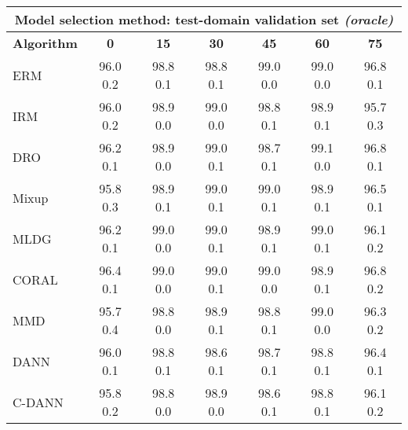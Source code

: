 \documentclass{article}
\begin{document}
\begin{center}
\begin{tabular}{lcccccc}
\toprule
\multicolumn{7}{c}{\textbf{Model selection method: test-domain validation set \textit{(oracle)}}} \\
\midrule
\textbf{Algorithm}    & \textbf{0}      & \textbf{15}     & \textbf{30}     & \textbf{45}     & \textbf{60}     & \textbf{75}     \\
\midrule
ERM                       & 96.0  0.2            & 98.8  0.1            & 98.8  0.1            & 99.0  0.0            & 99.0  0.0            & 96.8  0.1            \\
IRM                       & 96.0  0.2            & 98.9  0.0            & 99.0  0.0            & 98.8  0.1            & 98.9  0.1            & 95.7  0.3            \\
DRO                 & 96.2  0.1            & 98.9  0.0            & 99.0  0.1            & 98.7  0.1            & 99.1  0.0            & 96.8  0.1            \\
Mixup                     & 95.8  0.3            & 98.9  0.1            & 99.0  0.1            & 99.0  0.1            & 98.9  0.1            & 96.5  0.1            \\
MLDG                      & 96.2  0.1            & 99.0  0.0            & 99.0  0.1            & 98.9  0.1            & 99.0  0.1            & 96.1  0.2            \\
CORAL                     & 96.4  0.1            & 99.0  0.0            & 99.0  0.1            & 99.0  0.0            & 98.9  0.1            & 96.8  0.2            \\
MMD                       & 95.7  0.4            & 98.8  0.0            & 98.9  0.1            & 98.8  0.1            & 99.0  0.0            & 96.3  0.2            \\
DANN                       & 96.0  0.1            & 98.8  0.1            & 98.6  0.1            & 98.7  0.1            & 98.8  0.1            & 96.4  0.1            \\
C-DANN                   & 95.8  0.2            & 98.8  0.0            & 98.9  0.0            & 98.6  0.1            & 98.8  0.1            & 96.1  0.2            \\
\bottomrule
\end{tabular}
\end{center}

\clearpage
\newpage
\end{document}
